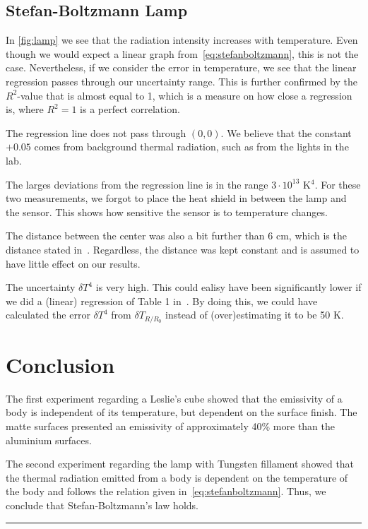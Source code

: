 \documentclass[5p,sort&compress]{elsarticle}
\begin{document}

\subsection{Stefan-Boltzmann Lamp}
In \autoref{fig:lamp} we see that the radiation intensity increases with temperature. Even though we would expect a linear graph from~\eqref{eq:stefanboltzmann}, this is not the case. Nevertheless, if we consider the error in temperature, we see that the linear regression passes through our uncertainty range. This is further confirmed by the $R^2$-value that is almost equal to 1, which is a measure on how close a regression is, where $R^2=1$ is a perfect correlation.

The regression line does not pass through $(0,0)$. We believe that the constant $+0.05$ comes from background thermal radiation, such as from the lights in the lab.

The larges deviations from the regression line is in the range $3\cdot10^{13}$ K$^4$. For these two measurements, we forgot to place the heat shield in between the lamp and the sensor. This shows how sensitive the sensor is to temperature changes.

The distance between the center was also a bit further than 6 cm, which is the distance stated in~\cite{pasco}. Regardless, the distance was kept constant and is assumed to have little effect on our results.

The uncertainty $\delta T^4$ is very high. This could ealisy have been significantly lower if we did a (linear) regression of Table 1 in~\cite{pasco}. By doing this, we could have calculated the error $\delta T^4$ from $\delta T_{R/R_0}$ instead of (over)estimating it to be 50 K.

\section{Conclusion}
The first experiment regarding a Leslie's cube showed that the emissivity of a body is independent of its temperature, but dependent on the surface finish. The matte surfaces presented an emissivity of approximately 40\% more than the aluminium surfaces. 

The second experiment regarding the lamp with Tungsten fillament showed that the thermal radiation emitted from a body is dependent on the temperature of the body and follows the relation given in~\eqref{eq:stefanboltzmann}. Thus, we conclude that Stefan-Boltzmann's law holds.

\begingroup
\begin{center}
    \rule{2cm}{.4pt}
\end{center}
\makeatletter


\end{document}
